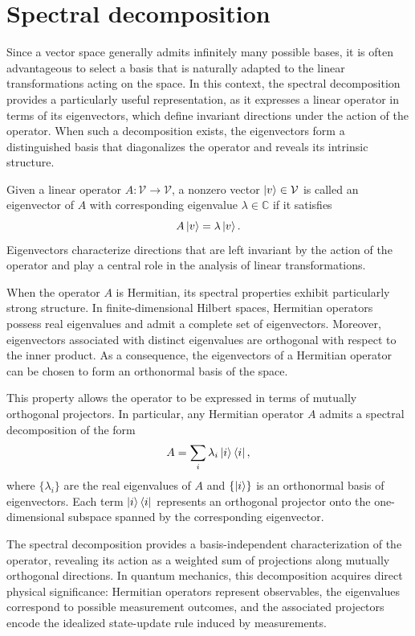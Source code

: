 \section{Spectral decomposition}
\label{sec:spectral-decomposition}

Since a vector space generally admits infinitely many possible bases, it is often advantageous to select a basis that is naturally adapted to the linear transformations acting on the space. In this context, the spectral decomposition provides a particularly useful representation, as it expresses a linear operator in terms of its eigenvectors, which define invariant directions under the action of the operator. When such a decomposition exists, the eigenvectors form a distinguished basis that diagonalizes the operator and reveals its intrinsic structure.

Given a linear operator $A : \mathcal{V} \to \mathcal{V}$, a nonzero vector $\ket{v} \in \mathcal{V}$ is called an eigenvector of $A$ with corresponding eigenvalue $\lambda \in \mathbb{C}$ if it satisfies
\begin{equation}
    A \ket{v} = \lambda \ket{v}.
\end{equation}
Eigenvectors characterize directions that are left invariant by the action of the operator and play a central role in the analysis of linear transformations.

When the operator $A$ is Hermitian, its spectral properties exhibit particularly strong structure. In finite-dimensional Hilbert spaces, Hermitian operators possess real eigenvalues and admit a complete set of eigenvectors. Moreover, eigenvectors associated with distinct eigenvalues are orthogonal with respect to the inner product. As a consequence, the eigenvectors of a Hermitian operator can be chosen to form an orthonormal basis of the space.

This property allows the operator to be expressed in terms of mutually orthogonal projectors. In particular, any Hermitian operator $A$ admits a spectral decomposition of the form
\begin{equation}
    A = \sum_i \lambda_i \ket{i}\bra{i},
\end{equation}
where $\{\lambda_i\}$ are the real eigenvalues of $A$ and $\{\ket{i}\}$ is an orthonormal basis of eigenvectors. Each term $\ket{i}\bra{i}$ represents an orthogonal projector onto the one-dimensional subspace spanned by the corresponding eigenvector.

The spectral decomposition provides a basis-independent characterization of the operator, revealing its action as a weighted sum of projections along mutually orthogonal directions. In quantum mechanics, this decomposition acquires direct physical significance: Hermitian operators represent observables, the eigenvalues correspond to possible measurement outcomes, and the associated projectors encode the idealized state-update rule induced by measurements.

